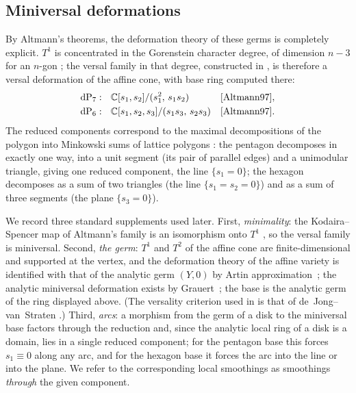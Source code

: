 \documentclass[11pt]{amsart}
\theoremstyle{definition}
\theoremstyle{remark}
\theoremstyle{plain}
\newcommand{\CC}{\mathbb{C}}
\newcommand{\dP}{\mathrm{dP}}
\begin{document}
\subsection{Miniversal deformations}\label{sec:miniversal}
By Altmann's theorems, the deformation theory of these germs is
completely explicit.  $T^1$ is concentrated in the Gorenstein
character degree, of dimension $n-3$ for an $n$-gon
\cite[(6.5) and the subsequent Remark]{Altmann95}; the versal family
in that degree, constructed in \cite{Altmann97}, is therefore a versal
deformation of the affine cone, with base ring computed there:
\[
\begin{aligned}
\dP_7&:\ \ \CC[s_1,s_2]/(s_1^2,\,s_1s_2)
&&\text{\cite[(9.1)(v)]{Altmann97}},\\
\dP_6&:\ \ \CC[s_1,s_2,s_3]/(s_1s_3,\,s_2s_3)
&&\text{\cite[(2.5)]{Altmann97}}.
\end{aligned}
\]
The reduced components correspond to the maximal decompositions of the
polygon into Minkowski sums of lattice polygons
\cite[(2.5),\,(8.1)]{Altmann97}: the pentagon decomposes in exactly
one way, into a unit segment (its pair of parallel edges) and a
unimodular triangle, giving
one reduced component, the line $\{s_1=0\}$; the hexagon decomposes as
a sum of two triangles (the line $\{s_1=s_2=0\}$) and as a sum of
three segments (the plane $\{s_3=0\}$).

We record three standard supplements used later.
First, \emph{minimality}: the Kodaira--Spencer map of Altmann's family
is an isomorphism onto $T^1$ \cite[(6.2),\,(6.3)]{Altmann97}, so the
versal family is miniversal.  Second, \emph{the germ}: $T^1$ and $T^2$
of the affine cone are finite-dimensional and supported at the vertex,
and the deformation theory of the affine variety is identified with
that of the analytic germ $(Y,0)$ by Artin
approximation~\cite{Artin69}; the analytic miniversal deformation
exists by Grauert~\cite{Grauert72}; the base is the analytic germ of
the ring displayed above.  (The versality criterion used in
\cite[(7.2)]{Altmann97} is that of de~Jong--van~Straten
\cite[\S4]{dJvS94}.)  Third, \emph{arcs}: a morphism from the germ of
a disk to the miniversal base factors through the reduction and,
since the analytic local ring of a disk is a domain, lies in a single
reduced component; for the pentagon base this forces $s_1\equiv0$
along any arc, and for the hexagon base it forces the arc into the
line or into the plane.  We refer to the corresponding local
smoothings as smoothings \emph{through} the given component.
\end{document}
